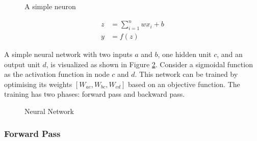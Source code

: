 \documentclass[12pt]{report} %
\begin{document}
\begin{figure}[!tbp]
	\centering
	\caption{A simple neuron}
	\label{neuron}
\end{figure}

\begin{align}
z & = \sum_{i=1}^{n} wx_i + b \\
y & = f(z)
\end{align}


 A simple neural network with two inputs $a$ and $b$, one hidden unit $c$, and an output unit $d$, is visualized as shown in Figure \ref{net}. Consider a sigmoidal function as the activation function in node $c$ and $d$. This network can be trained by optimising its weights $[W_{ac}, W_{bc}, W_{cd}]$ based on an objective function. The training has two phases: forward pass and backward pass.



\begin{figure}[h]
	\centering
	\caption{Neural Network}
	\label{net}
\end{figure} 



\subsubsection*{Forward Pass}
\end{document}
